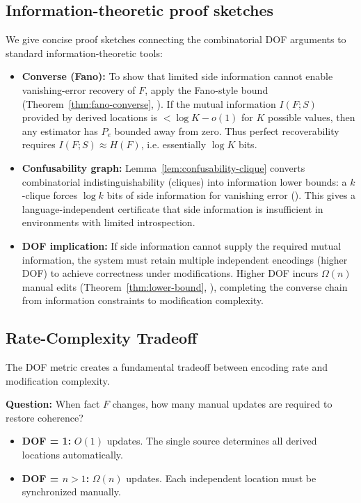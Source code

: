 \subsection{Information-theoretic proof sketches}
\label{sec:info-sketches}

We give concise proof sketches connecting the combinatorial DOF arguments to standard information-theoretic tools:

\begin{itemize}
\item \textbf{Converse (Fano):} To show that limited side information cannot enable vanishing-error recovery of $F$, apply the Fano-style bound (Theorem~\ref{thm:fano-converse}, ). If the mutual information $I(F;S)$ provided by derived locations is $<\log K - o(1)$ for $K$ possible values, then any estimator has $P_e$ bounded away from zero. Thus perfect recoverability requires $I(F;S)\approx H(F)$, i.e. essentially $\log K$ bits.

\item \textbf{Confusability graph:} Lemma~\ref{lem:confusability-clique} converts combinatorial indistinguishability (cliques) into information lower bounds: a $k$-clique forces $\log k$ bits of side information for vanishing error (). This gives a language-independent certificate that side information is insufficient in environments with limited introspection.

\item \textbf{DOF implication:} If side information cannot supply the required mutual information, the system must retain multiple independent encodings (higher DOF) to achieve correctness under modifications. Higher DOF incurs $\Omega(n)$ manual edits (Theorem~\ref{thm:lower-bound}, ), completing the converse chain from information constraints to modification complexity.
\end{itemize}


\subsection{Rate-Complexity Tradeoff}\label{sec:ssot-vs-m}

The DOF metric creates a fundamental tradeoff between encoding rate and modification complexity.

\textbf{Question:} When fact $F$ changes, how many manual updates are required to restore coherence?

\begin{itemize}
\tightlist
\item \textbf{DOF = 1:} $O(1)$ updates. The single source determines all derived locations automatically.
\item \textbf{DOF = $n > 1$:} $\Omega(n)$ updates. Each independent location must be synchronized manually.
\end{itemize}


